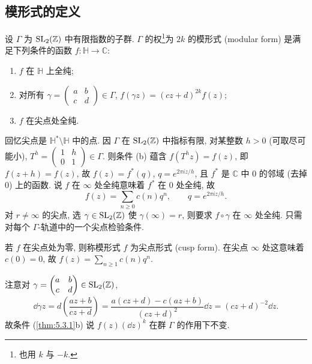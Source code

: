 \subsection*{模形式的定义}

\begin{definition} \label{thm:5.3.1} 
设 $\Gamma$ 为 $\operatorname{SL}_2(\mathbb{Z})$ 中有限指数的子群. $\Gamma$ 的权\footnote{也用 $k$ 与 $-k$.}为 $2k$ 的模形式 (modular form) 是满足下列条件的函数 $f\colon\mathbb{H}\to\mathbb{C}$:
\begin{enumerate}[label=\textup{(\alph*)}]
\item $f$ 在 $\mathbb{H}$ 上全纯;
\item 对所有 $\gamma = \begin{pmatrix}a & b\\ c & d\end{pmatrix}\in\Gamma$, $f(\gamma z) = (cz+d)^{2k}f(z)$;
\item $f$ 在尖点处全纯.
\end{enumerate}
\end{definition}

回忆尖点是 $\mathbb{H}^*\setminus\mathbb{H}$ 中的点. 因 $\Gamma$ 在 $\operatorname{SL}_2(\mathbb{Z})$ 中指标有限, 对某整数 $h > 0$ (可取尽可能小), $T^h = \begin{pmatrix}1 & h\\ 0 & 1\end{pmatrix}\in\Gamma$. 则条件 (b) 蕴含 $f(T^hz) = f(z)$, 即 $f(z+h) = f(z)$, 故 $f(z) = f^*(q)$, $q = e^{2\pi iz/h}$, 且 $f^*$ 是 $\mathbb{C}$ 中 $0$ 的邻域 (去掉 $0$) 上的函数. 说 $f$ 在 $\infty$ 处全纯意味着 $f^*$ 在 $0$ 处全纯, 故
\[
f(z) = \sum_{n\ge 0}c(n)q^n, \qquad q = e^{2\pi iz/h}.
\]
对 $r\neq\infty$ 的尖点, 选 $\gamma\in\operatorname{SL}_2(\mathbb{Z})$ 使 $\gamma(\infty) = r$, 则要求 $f\circ\gamma$ 在 $\infty$ 处全纯. 只需对每个 $\Gamma$-轨道中的一个尖点检验条件.

若 $f$ 在尖点处为零, 则称模形式 $f$ 为尖点形式 (cusp form). 在尖点 $\infty$ 处这意味着 $c(0) = 0$, 故 $f(z) = \sum_{n\ge 1}c(n)q^n$.

\begin{remark} \label{thm:5.3.2} 
注意对 $\gamma = \begin{pmatrix}a & b\\ c & d\end{pmatrix}\in\operatorname{SL}_2(\mathbb{Z})$,
\[
\dd \gamma z = d\left(\frac{az+b}{cz+d}\right) = \frac{a(cz+d) - c(az+b)}{(cz+d)^2}\dd z = (cz+d)^{-2}\dd z.
\]
故条件 (\ref{thm:5.3.1}b) 说 $f(z)(\dd z)^k$ 在群 $\Gamma$ 的作用下不变.
\end{remark}

